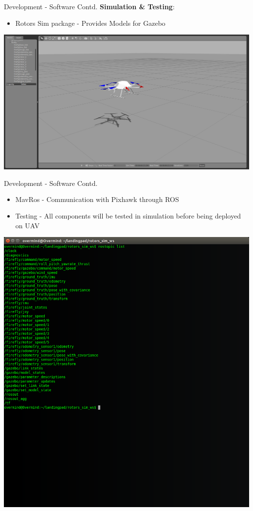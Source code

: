 \documentclass[11pt]{beamer}
\begin{document}
\begin{frame}{Development - Software Contd.}
\textbf{Simulation \& Testing}: 
\begin{itemize}
\item Rotors Sim package - Provides Models for Gazebo
\end{itemize}
\centerline{\includegraphics[scale=0.15]{images/Gazebo_Joy.png}}
\end{frame}

\begin{frame}{Development - Software Contd.}
\begin{itemize} 
\item MavRos - Communication with Pixhawk through ROS
\item Testing - All components will be tested in simulation before being deployed on UAV
\end{itemize}
\centerline{\includegraphics[scale=0.15]{images/Ros_Topics.png}}
\end{frame}
\end{document}
